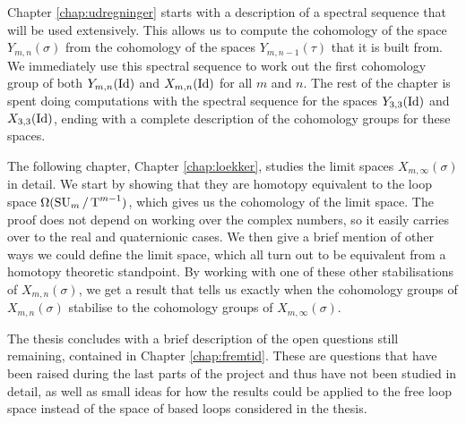 Chapter \ref{chap:udregninger} starts with a description of a spectral
sequence that will be used extensively. This allows us to compute the
cohomology of the space $Y_{m,n}(\sigma)$ from the cohomology of the
spaces $Y_{m,n-1}(\tau)$ that it is built from. We immediately use
this spectral sequence to work out the first cohomology group of both
$Y_{m,n}(\operatorname{Id})$ and $X_{m,n}(\operatorname{Id})$ for all $m$ and $n$. The rest of the
chapter is spent doing computations with the spectral sequence for the
spaces $Y_{3,3}(\operatorname{Id})$ and
$X_{3,3}(\operatorname{Id})$, ending with a complete description of the cohomology
groups for these spaces.

The following chapter, Chapter \ref{chap:loekker}, studies the limit
spaces $X_{m,\infty}(\sigma)$ in detail. We start by showing that they
are homotopy equivalent to the loop space $\Omega(\operatorname{SU}_{m}/\operatorname{T}^{m-1})$, which
gives us the cohomology of the limit space. The proof does not depend
on working over the complex numbers, so it easily carries over to the
real and quaternionic cases. We then give a brief
mention of other ways we could define the limit space, which all turn
out to be equivalent from a homotopy theoretic standpoint. By working
with one of these other stabilisations of $X_{m,n}(\sigma)$, we get a
result that tells us exactly when the cohomology groups of
$X_{m,n}(\sigma)$ stabilise to the cohomology groups of
$X_{m,\infty}(\sigma)$.

The thesis concludes with a brief description of the open questions
still remaining, contained in Chapter \ref{chap:fremtid}. These are
questions that have been raised during the last parts of the project
and thus have not been studied in detail, as well as small ideas for
how the results could be applied to the free loop space instead of
the space of based loops considered in the thesis.





